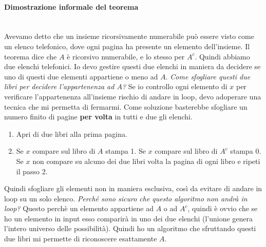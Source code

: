 \documentclass{article}
\begin{document}
\paragraph{Dimostrazione informale del teorema}\mbox{}\\
Avevamo detto che un insieme ricorsivamente numerabile può essere visto come
un elenco telefonico, dove ogni pagina ha presente un elemento dell'insieme.
Il teorema dice che $A$ è ricorsivo numerabile, e lo stesso per $A^c$. Quindi abbiamo
due elenchi telefonici. Io devo gestire questi due elenchi in maniera da decidere
se uno di questi due elementi appartiene o meno ad $A$. \textit{Come sfogliare
    questi due libri per decidere l'appartenenza ad $A$?} Se io controllo ogni elemento
di $x$ per verificare l'appartenenza all'insieme rischio di andare in loop, devo
adoperare una tecnica che mi permetta di fermarmi. Come soluzione basterebbe sfogliare
un numero finito di pagine \textbf{per volta} in tutti e due gli elenchi.
\begin{enumerate}
    \item Apri di due libri alla prima pagina.
    \item Se $x$ compare sul libro di $A$ stampa 1. Se $x$ compare sul libro di $A^c$
          stampa 0. Se $x$ non compare su alcuno dei due libri volta la pagina di ogni libro
          e ripeti il passo 2.
\end{enumerate}
Quindi sfogliare gli elementi non in maniera esclusiva, così da evitare di andare
in loop su un solo elenco. \textit{Perché sono sicuro che questo algoritmo non
    andrà in loop?} Questo perchè un elemento appartiene ad $A$ o ad $A^c$, quindi
è ovvio che se ho un elemento in input esso comparirà in uno dei due elenchi (l'unione
genera l'intero universo delle possibilità).
Quindi ho un algoritmo che sfruttando questi due libri mi permette di riconoscere
esattamente $A$.
\end{document}
